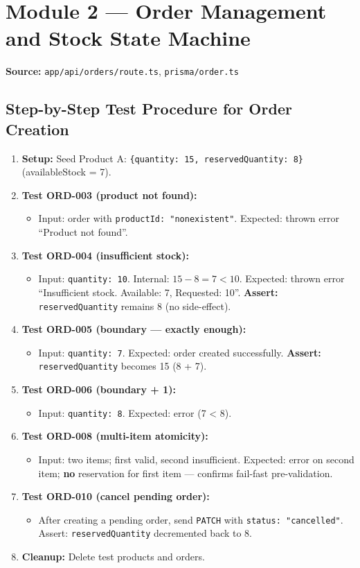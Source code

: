 \documentclass[12pt,a4paper]{report}
\begin{document}
\section{Module 2 --- Order Management and Stock State Machine}

\textbf{Source:} \texttt{app/api/orders/route.ts}, \texttt{prisma/order.ts}

\subsection{Step-by-Step Test Procedure for Order Creation}

\begin{enumerate}
    \item \textbf{Setup:} Seed Product A: \texttt{\{quantity: 15, reservedQuantity: 8\}} (availableStock = 7).
    \item \textbf{Test ORD-003 (product not found):}
        \begin{itemize}\item Input: order with \texttt{productId: "nonexistent"}. Expected: thrown error ``Product not found''.\end{itemize}
    \item \textbf{Test ORD-004 (insufficient stock):}
        \begin{itemize}\item Input: \texttt{quantity: 10}. Internal: $15 - 8 = 7 < 10$. Expected: thrown error ``Insufficient stock. Available: 7, Requested: 10''. \textbf{Assert:} \texttt{reservedQuantity} remains 8 (no side-effect).\end{itemize}
    \item \textbf{Test ORD-005 (boundary --- exactly enough):}
        \begin{itemize}\item Input: \texttt{quantity: 7}. Expected: order created successfully. \textbf{Assert:} \texttt{reservedQuantity} becomes 15 (8 + 7).\end{itemize}
    \item \textbf{Test ORD-006 (boundary + 1):}
        \begin{itemize}\item Input: \texttt{quantity: 8}. Expected: error (7 < 8).\end{itemize}
    \item \textbf{Test ORD-008 (multi-item atomicity):}
        \begin{itemize}\item Input: two items; first valid, second insufficient. Expected: error on second item; \textbf{no} reservation for first item --- confirms fail-fast pre-validation.\end{itemize}
    \item \textbf{Test ORD-010 (cancel pending order):}
        \begin{itemize}\item After creating a pending order, send \texttt{PATCH} with \texttt{status: "cancelled"}. Assert: \texttt{reservedQuantity} decremented back to 8.\end{itemize}
    \item \textbf{Cleanup:} Delete test products and orders.
\end{enumerate}
\end{document}
